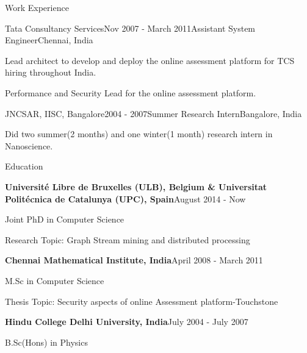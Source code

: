 \documentclass{resume} %
\begin{document}
\begin{rSection}{Work Experience}
\begin{rSubsection}{Tata Consultancy Services}{Nov 2007 - March 2011}{Assistant System Engineer}{Chennai, India}
\item Lead architect to develop and deploy the online assessment platform for TCS hiring throughout India.
\item Performance and Security Lead for the online assessment platform.
\end{rSubsection}
\begin{rSubsection}{JNCSAR, IISC, Bangalore}{2004 - 2007}{Summer Research Intern}{Bangalore, India}
\item Did two summer(2 months) and one winter(1 month) research intern in Nanoscience.
\end{rSubsection}

\end{rSection}


\begin{rSection}{Education}
\begin{rSubsection}{\bf Universit\'{e} Libre de Bruxelles (ULB), Belgium \&  Universitat Polit\'{e}cnica de Catalunya (UPC), Spain}{August 2014 - Now}{}{}  
\item Joint PhD in Computer Science 
\item Research Topic: Graph Stream mining and distributed processing
\end{rSubsection}
\begin{rSubsection}{\bf Chennai Mathematical Institute, India}{April 2008 - March 2011}{}{}  
\item M.Sc in Computer Science 
\item Thesis Topic: Security aspects of online Assessment platform-Touchstone
\end{rSubsection}
\begin{rSubsection}{\bf Hindu College Delhi University, India}{July 2004 - July 2007}{}{}  
\item B.Sc(Hons) in Physics
\end{rSubsection}
\end{rSection}
\end{document}
